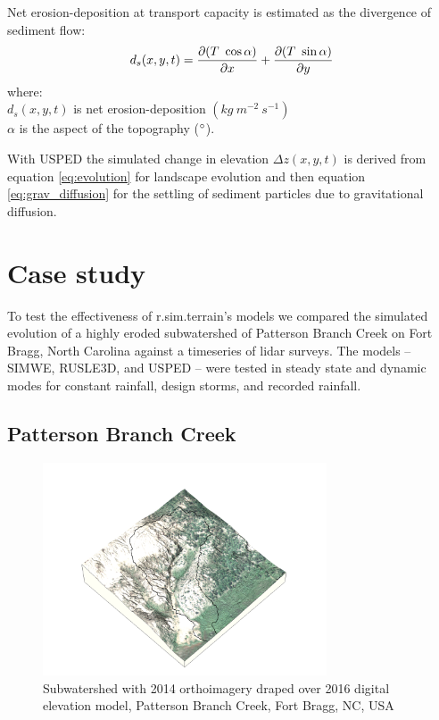 \documentclass[esurf, manuscript]{copernicus}
\begin{document}
Net erosion-deposition at transport capacity is estimated as the divergence of sediment flow: 
\begin{equation}\label{eq:usped_erdep} 
d_s(x,y,t) = 
{\partial (T ~ \cos \alpha) \over \partial x} +
{\partial (T ~ \sin \alpha) \over \partial y}
\end{equation}
{\small
\noindent
where: \\
\hspace*{0.5em} $d_s(x,y,t)$ is net erosion-deposition $(kg ~ m^{-2} ~ s^{-1})$\\
\hspace*{0.5em} $\alpha$ is the aspect of the topography ($^{\circ}$).\\
}

With USPED the simulated change in elevation $\Delta z(x,y,t)$
is derived from equation \ref{eq:evolution} for landscape evolution
and then equation \ref{eq:grav_diffusion}
for the settling of sediment particles due to gravitational diffusion.


\section{Case study} 

To test the effectiveness of r.sim.terrain's models 
we compared the simulated evolution
of a highly eroded subwatershed of 
Patterson Branch Creek on Fort Bragg, North Carolina
against a timeseries of lidar surveys.
The models -- SIMWE, RUSLE3D, and USPED --
were tested in steady state and dynamic modes
for constant rainfall, design storms, and recorded rainfall.

\subsection{Patterson Branch Creek}

\begin{figure}
\centering
\includegraphics[width=0.75\textwidth]{../images/sample_data_3d/naip_2014.png}
\caption{Subwatershed with 2014 orthoimagery draped over 2016 digital elevation model, Patterson Branch Creek, Fort Bragg, NC, USA}
\label{fig:3d}
\end{figure}
\end{document}
